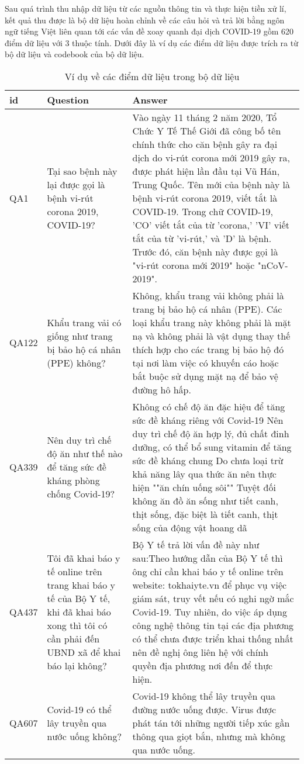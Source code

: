 \documentclass[runningheads]{llncs}
\begin{document}
Sau quá trình thu nhập dữ liệu từ các nguồn thông tin và thực hiện tiền xử lí, kết quả thu được là bộ dữ liệu hoàn chỉnh về các câu hỏi và trả lời bằng ngôn ngữ tiếng Việt liên quan tới các vấn đề xoay quanh đại dịch COVID-19 gồm 620 điểm dữ liệu với 3 thuộc tính. Dưới đây là ví dụ các điểm dữ liệu được trích ra từ bộ dữ liệu và codebook của bộ dữ liệu.

\begin{table}
	\setlength{\tabcolsep}{0.5em}
	\renewcommand{\arraystretch}{1.4}
	\begin{center}
	\caption{Ví dụ về các điểm dữ liệu trong bộ dữ liệu}\label{tab4}
		\begin{tabular}{ | p{1.25cm} | p{5cm} | p{5cm} |} 
			\hline
    		\textbf{id} & \textbf{Question} & \textbf{Answer}\\ 
			\hline
			QA1 & Tại sao bệnh này lại được gọi là bệnh vi-rút corona 2019, COVID-19?&Vào ngày 11 tháng 2 năm 2020, Tổ Chức Y Tế Thế Giới đã công bố tên chính thức cho căn bệnh gây ra đại dịch do vi-rút corona mới 2019 gây ra, được phát hiện lần đầu tại Vũ Hán, Trung Quốc. Tên mới của bệnh này là bệnh vi-rút corona 2019, viết tắt là COVID-19. Trong chữ COVID-19, 'CO' viết tắt của từ 'corona,' 'VI' viết tắt của từ 'vi-rút,' và 'D' là bệnh. Trước đó, căn bệnh này được gọi là "vi-rút corona mới 2019" hoặc "nCoV-2019".
			\\ 
			\hline
			QA122&Khẩu trang vải có giống như trang bị bảo hộ cá nhân (PPE) không?&Không, khẩu trang vải không phải là trang bị bảo hộ cá nhân (PPE). Các loại khẩu trang này không phải là mặt nạ và không phải là vật dụng thay thế thích hợp cho các trang bị bảo hộ đó tại nơi làm việc có khuyến cáo hoặc bắt buộc sử dụng mặt nạ để bảo vệ đường hô hấp.
			\\
			\hline
			QA339&Nên duy trì chế độ ăn như thế nào để tăng sức đề kháng phòng chống Covid-19?&Không có chế độ ăn đặc hiệu để tăng sức đề kháng riêng với Covid-19  
			Nên duy trì chế độ ăn hợp lý, đủ chất đinh dưỡng, có thể bổ sung vitamin để tăng sức đề kháng chung Do chưa loại trừ khả năng lây qua thức ăn nên thực hiện ""ăn chín uống sôi"" Tuyệt đối không ăn đồ ăn sống như tiết canh, thịt sống, đặc biệt là tiết canh, thịt sống của động vật hoang dã\\
			\hline
			QA437&Tôi đã khai báo y tế online trên trang khai báo y tế của Bộ Y tế, khi đã khai báo xong thì tôi có cần phải đến UBND xã để khai báo lại không?&Bộ Y tế trả lời vấn đề này như sau:Theo hướng dẫn của Bộ Y tế thì ông chỉ cần khai báo y tế online trên website: tokhaiyte.vn để phục vụ việc giám sát, truy vết nếu có nghi ngờ mắc Covid-19. Tuy nhiên, do việc áp dụng công nghệ thông tin tại các địa phương có thể chưa được triển khai thống nhất nên đề nghị ông liên hệ với chính quyền địa phương nơi đến để thực hiện.\\
			\hline
			QA607& Covid-19 có thể lây truyền qua nước uống không? &Covid-19 không thể lây truyền qua đường nước uống được. Virus được phát tán tới những người tiếp xúc gần thông qua giọt bắn, nhưng mà không qua nước uống.\\
			\hline
			\end{tabular}
		\end{center}
\end{table}
\end{document}
